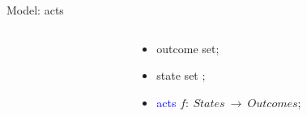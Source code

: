 \documentclass[usenames,dvipsnames,aspectratio=169,11pt, envcountsect, handout]{beamer}
\begin{document}
\begin{frame}[noframenumbering]{Model: acts}
\begin{columns}
\begin{column}{0.45\textwidth}
\begin{center}
\begin{table}[H]
				\end{table}
			\end{center}
		\end{column}

		\begin{column}{0.55\textwidth}  %
			\begin{itemize}
				\item outcome set;
				\item state set ;
				\item \textcolor{blue}{acts} \( f : \: States \: \rightarrow \: Outcomes \);
			\end{itemize}
		\end{column}
	\end{columns}

\end{frame}
\end{document}
